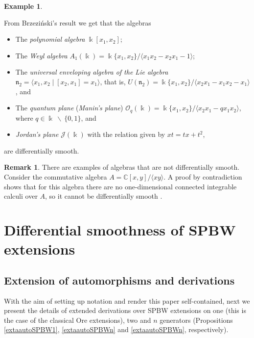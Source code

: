 \documentclass{amsart}
\theoremstyle{definition}
\newtheorem{remark}[theorem]{Remark}
\newtheorem{example}[theorem]{Example}
\theoremstyle{remark}
\numberwithin{equation}{section}
\begin{document}
\begin{example}
\begin{enumerate}
From Brzezi{\'n}ski's result we get that the algebras
\begin{itemize}
 \item The {\em polynomial algebra} $\Bbbk[x_1, x_2]$;
        
        \item The {\em Weyl algebra} $A_1(\Bbbk) = \Bbbk\{x_1, x_2\} / \langle x_1x_2 - x_2x_1 - 1\rangle$;
        
        \item The {\em universal enveloping algebra of the Lie algebra} $\mathfrak{n}_2 = \langle x_1, x_2\mid [x_2, x_1] = x_1\rangle$, that is, $U(\mathfrak{n}_2) = \Bbbk\{x_1, x_2\} / \langle x_2x_1 - x_1x_2 - x_1\rangle$, and
        
        \item The {\em quantum plane} ({\em Manin's plane}) $\mathcal{O}_q(\Bbbk) = \Bbbk \{x_1, x_2\} / \langle x_2 x_1 - qx_1 x_2\rangle$, where $q\in \Bbbk\ \backslash\ \{0,1\}$, and

\item {\em Jordan's plane} $\mathcal{J}(\Bbbk)$ with the relation given by $xt = tx + t^2$, 
\end{itemize}

are differentially smooth.
\end{enumerate}
\end{example}

\begin{remark}
There are examples of algebras that are not differentially smooth. Consider the commutative algebra $A = \mathbb{C}[x, y] / \langle xy \rangle$. A proof by contradiction shows that for this algebra there are no one-dimensional connected integrable calculi over $A$, so it cannot be differentially smooth \cite[Example 2.5]{BrzezinskiSitarz2017}.
\end{remark}


\section{Differential smoothness of SPBW extensions}\label{DSSPBW4originalresults}

\subsection{Extension of automorphisms and derivations }\label{ASPBWpreliminaries}

With the aim of setting up notation and render this paper self-contained, next we present the details of extended derivations over SPBW extensions on one (this is the case of the classical Ore extensions), two and $n$ generators (Propositions \ref{extaautoSPBW1}, \ref{extaautoSPBWn} and \ref{extaautoSPBWn}, respectively).
\end{document}
